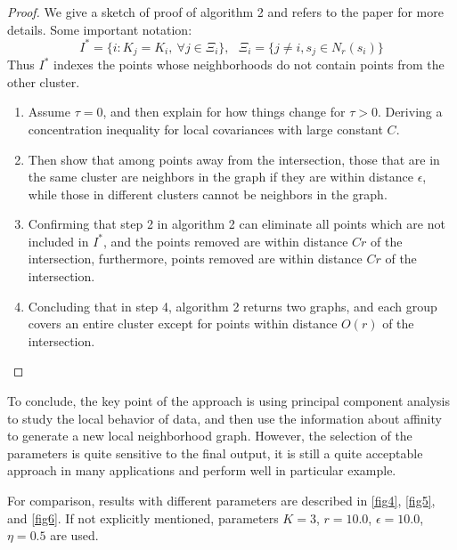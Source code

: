 \documentclass[twoside,11pt]{article}
\begin{document}
\begin{proof}
We give a sketch of proof of algorithm 2 and refers to the paper for more details. Some important notation:
$$
I^*=\{i: K_j=K_i,\ \forall j\in\Xi_i  \},\ \ \ \Xi_i=\{j\ne i, s_j\in N_r(s_i)   \}
$$
Thus $I^*$ indexes the points whose neighborhoods do not contain points from the other cluster.
\begin{enumerate}
\item Assume $\tau=0$, and then explain for how things change for $\tau>0$. Deriving a concentration inequality for local covariances with large constant $C$.
\item Then show that among points away from the intersection, those that are in the same cluster are neighbors in the graph if they are within distance $\epsilon$, while those in different clusters cannot be neighbors in the graph.
\item Confirming that step 2 in algorithm 2 can eliminate all points which are not included in $I^*$, and  the points removed are within distance $Cr$ of the intersection, furthermore,  points removed are within distance $Cr$ of the intersection.
\item Concluding that in step 4, algorithm 2 returns two graphs, and each group covers an entire cluster except for points within distance $O(r)$ of the intersection.
\end{enumerate}
\end{proof}

To conclude, the key point of the approach is using principal component analysis to study the local behavior of data, and then use the information about affinity to generate a new local neighborhood graph.
However, the selection of the parameters is quite sensitive to the final output, it is still a quite acceptable approach in many applications and perform well in particular example.

For comparison, results with different parameters are described in \autoref{fig4}, \autoref{fig5}, and \autoref{fig6}. If not explicitly mentioned, parameters $K = 3$, $r = 10.0$, $\epsilon = 10.0$, $\eta = 0.5$ are used.
\end{document}
